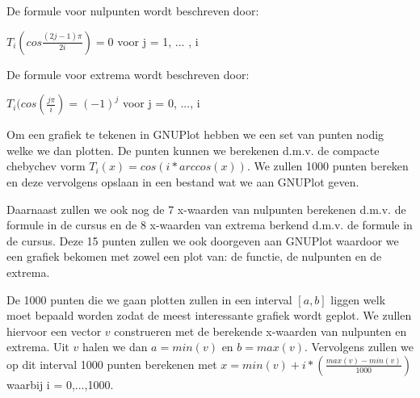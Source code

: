 \documentclass{article}
\begin{document}
\begin{flushleft}
De formule voor nulpunten wordt beschreven door:
\newline

$ T_{i}(cos \frac{(2j - 1)\pi}{2i}) = 0 $ voor j = 1, ... , i
\newline

De formule voor extrema wordt beschreven door:
\newline

$ T_{i}(cos(\frac{j\pi}{i}) = (-1)^{j} $ voor j = 0, ..., i
\newline

Om een grafiek te tekenen in GNUPlot hebben we een set van punten nodig welke we dan plotten. De punten kunnen we berekenen d.m.v. de compacte chebychev vorm $ T_{i}(x) = cos(i*arccos(x)) $. We zullen 1000 punten bereken en deze vervolgens opslaan in een bestand wat we aan GNUPlot geven.
\newline

Daarnaast zullen we ook nog de 7 x-waarden van nulpunten berekenen d.m.v. de formule in de cursus en de 8 x-waarden van extrema berkend d.m.v. de formule in de cursus. Deze 15 punten zullen we ook doorgeven aan GNUPlot waardoor we een grafiek bekomen met zowel een plot van: de functie, de nulpunten en de extrema.
\newline

De 1000 punten die we gaan plotten zullen in een interval $[a, b]$ liggen welk moet bepaald worden zodat de meest interessante grafiek wordt geplot. We zullen hiervoor een vector $ v$ construeren met de berekende x-waarden van nulpunten en extrema. Uit $v$ halen we dan $a = min(v)$ en $b = max(v)$. Vervolgens zullen we op dit interval 1000 punten berekenen met $x = min(v) + i *(\frac{max(v)-min(v)}{1000})$ waarbij i = 0,...,1000.
\newline


\end{flushleft}
\end{document}
